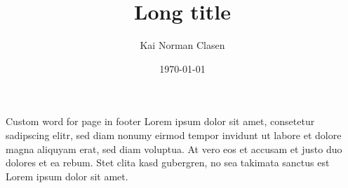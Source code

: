 \documentclass[aspectratio=169]{beamer}
\title[Custom word for page]{Long title}
\author{Kai Norman Clasen}
\institute{}
\date{\today}
\begin{document}
\begin{frame}{Custom word for page in footer}
  Lorem ipsum dolor sit amet, consetetur sadipscing elitr,
  sed diam nonumy eirmod tempor invidunt ut labore et dolore
  magna aliquyam erat, sed diam voluptua.
  At vero eos et accusam et justo duo dolores et ea rebum.
  Stet clita kasd gubergren, no sea takimata sanctus est
  Lorem ipsum dolor sit amet.
\end{frame}
\end{document}
